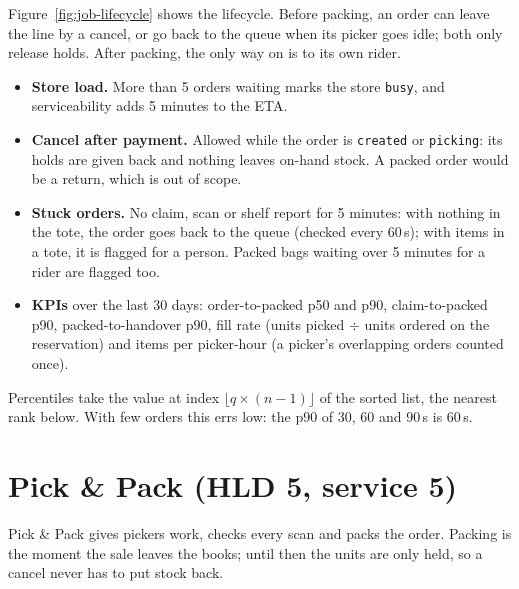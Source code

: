 Figure~\ref{fig:job-lifecycle} shows the lifecycle. Before packing, an order can leave the line by a cancel, or go back
to the queue when its picker goes idle; both only release holds. After packing, the only way on is to its own rider.

\begin{itemize}
  \item \textbf{Store load.} More than 5 orders waiting marks the store \texttt{busy}, and serviceability adds
    5 minutes to the ETA.
  \item \textbf{Cancel after payment.} Allowed while the order is \texttt{created} or \texttt{picking}: its holds are
    given back and nothing leaves on-hand stock. A packed order would be a return, which is out of scope.
  \item \textbf{Stuck orders.} No claim, scan or shelf report for 5 minutes: with nothing in the tote, the order goes
    back to the queue (checked every 60\,s); with items in a tote, it is flagged for a person. Packed bags waiting
    over 5 minutes for a rider are flagged too.
  \item \textbf{KPIs} over the last 30 days: order-to-packed p50 and p90, claim-to-packed p90, packed-to-handover
    p90, fill rate (units picked $\div$ units ordered on the reservation) and items per picker-hour (a picker's
    overlapping orders counted once).
\end{itemize}

Percentiles take the value at index $\lfloor q \times (n - 1) \rfloor$ of the sorted list, the nearest rank below.
With few orders this errs low: the p90 of 30, 60 and 90\,s is 60\,s.

\section{Pick \& Pack (HLD 5, service 5)}

Pick \& Pack gives pickers work, checks every scan and packs the order. Packing is the moment the sale leaves the
books; until then the units are only held, so a cancel never has to put stock back.

